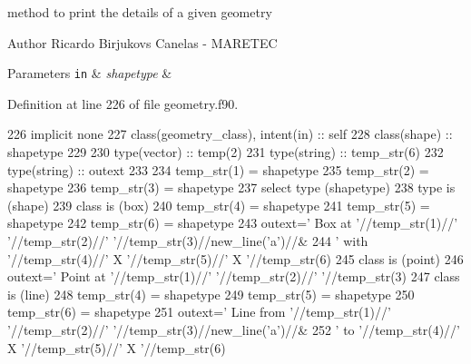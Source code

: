 method to print the details of a given geometry 

\begin{DoxyAuthor}{Author}
Ricardo Birjukovs Canelas -\/ M\+A\+R\+E\+T\+EC
\end{DoxyAuthor}

\begin{DoxyParams}[1]{Parameters}
\mbox{\tt in}  & {\em shapetype} & \\
\hline
\end{DoxyParams}


Definition at line 226 of file geometry.\+f90.


\begin{DoxyCode}
226     \textcolor{keywordtype}{implicit none}
227     \textcolor{keywordtype}{class}(geometry\_class), \textcolor{keywordtype}{intent(in)} :: self
228     \textcolor{keywordtype}{class}(shape) :: shapetype
229     
230     \textcolor{keywordtype}{type}(vector) :: temp(2)
231     \textcolor{keywordtype}{type}(string) :: temp\_str(6)
232     \textcolor{keywordtype}{type}(string) :: outext
233 
234     temp\_str(1) = shapetype%
235     temp\_str(2) = shapetype%
236     temp\_str(3) = shapetype%
237     \textcolor{keywordflow}{select type} (shapetype)
238 \textcolor{keywordflow}{    type is} (shape)
239 \textcolor{keywordflow}{    class is} (box)
240         temp\_str(4) = shapetype%
241         temp\_str(5) = shapetype%
242         temp\_str(6) = shapetype%
243         outext=\textcolor{stringliteral}{'      Box at '}//temp\_str(1)//\textcolor{stringliteral}{' '}//temp\_str(2)//\textcolor{stringliteral}{' '}//temp\_str(3)//new\_line(\textcolor{stringliteral}{'a'})//&
244                \textcolor{stringliteral}{'       with '}//temp\_str(4)//\textcolor{stringliteral}{' X '}//temp\_str(5)//\textcolor{stringliteral}{' X '}//temp\_str(6)      
245 \textcolor{keywordflow}{    class is} (point)
246         outext=\textcolor{stringliteral}{'      Point at '}//temp\_str(1)//\textcolor{stringliteral}{' '}//temp\_str(2)//\textcolor{stringliteral}{' '}//temp\_str(3)
247 \textcolor{keywordflow}{    class is} (line)
248         temp\_str(4) = shapetype%
249         temp\_str(5) = shapetype%
250         temp\_str(6) = shapetype%
251         outext=\textcolor{stringliteral}{'      Line from '}//temp\_str(1)//\textcolor{stringliteral}{' '}//temp\_str(2)//\textcolor{stringliteral}{' '}//temp\_str(3)//new\_line(\textcolor{stringliteral}{'a'})//&
252                \textcolor{stringliteral}{'       to '}//temp\_str(4)//\textcolor{stringliteral}{' X '}//temp\_str(5)//\textcolor{stringliteral}{' X '}//temp\_str(6)

\end{DoxyCode}
